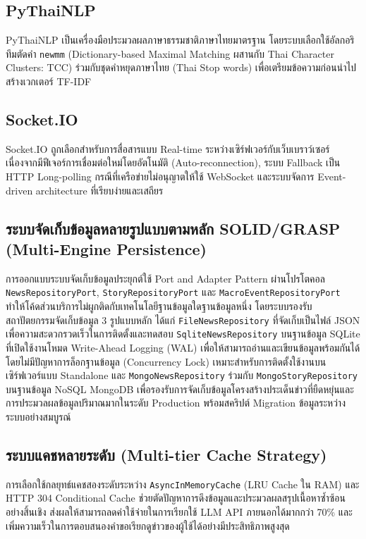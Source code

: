 \subsection{PyThaiNLP}
PyThaiNLP \cite{pythainlp2021} เป็นเครื่องมือประมวลผลภาษาธรรมชาติภาษาไทยมาตรฐาน โดยระบบเลือกใช้อัลกอริทึมตัดคำ \texttt{newmm} (Dictionary-based Maximal Matching ผสานกับ Thai Character Clusters: TCC) ร่วมกับชุดคำหยุดภาษาไทย (Thai Stop words) เพื่อเตรียมข้อความก่อนนำไปสร้างเวกเตอร์ TF-IDF

\subsection{Socket.IO}
Socket.IO \cite{socketio2024} ถูกเลือกสำหรับการสื่อสารแบบ Real-time ระหว่างเซิร์ฟเวอร์กับเว็บเบราว์เซอร์ เนื่องจากมีฟีเจอร์การเชื่อมต่อใหม่โดยอัตโนมัติ (Auto-reconnection), ระบบ Fallback เป็น HTTP Long-polling กรณีที่เครือข่ายไม่อนุญาตให้ใช้ WebSocket และระบบจัดการ Event-driven architecture ที่เรียบง่ายและเสถียร


\subsection{ระบบจัดเก็บข้อมูลหลายรูปแบบตามหลัก SOLID/GRASP (Multi-Engine Persistence)}
การออกแบบระบบจัดเก็บข้อมูลประยุกต์ใช้ Port and Adapter Pattern ผ่านโปรโตคอล \texttt{NewsRepositoryPort}, \texttt{StoryRepositoryPort} และ \texttt{MacroEventRepositoryPort} ทำให้โค้ดส่วนบริการไม่ผูกติดกับเทคโนโลยีฐานข้อมูลใดฐานข้อมูลหนึ่ง โดยระบบรองรับสถาปัตยกรรมจัดเก็บข้อมูล 3 รูปแบบหลัก ได้แก่ \texttt{FileNewsRepository} ที่จัดเก็บเป็นไฟล์ JSON เพื่อความสะดวกรวดเร็วในการติดตั้งและทดสอบ \texttt{SqliteNewsRepository} บนฐานข้อมูล SQLite ที่เปิดใช้งานโหมด Write-Ahead Logging (WAL) \cite{sqlite_wal} เพื่อให้สามารถอ่านและเขียนข้อมูลพร้อมกันได้โดยไม่มีปัญหาการล็อกฐานข้อมูล (Concurrency Lock) เหมาะสำหรับการติดตั้งใช้งานบนเซิร์ฟเวอร์แบบ Standalone และ \texttt{MongoNewsRepository} ร่วมกับ \texttt{MongoStoryRepository} บนฐานข้อมูล NoSQL MongoDB เพื่อรองรับการจัดเก็บข้อมูลโครงสร้างประเด็นข่าวที่ยืดหยุ่นและการประมวลผลข้อมูลปริมาณมากในระดับ Production พร้อมสคริปต์ Migration ข้อมูลระหว่างระบบอย่างสมบูรณ์


\subsection{ระบบแคชหลายระดับ (Multi-tier Cache Strategy)}
การเลือกใช้กลยุทธ์แคชสองระดับระหว่าง \texttt{AsyncInMemoryCache} (LRU Cache ใน RAM) และ HTTP 304 Conditional Cache ช่วยตัดปัญหาการดึงข้อมูลและประมวลผลสรุปเนื้อหาซ้ำซ้อนอย่างสิ้นเชิง ส่งผลให้สามารถลดค่าใช้จ่ายในการเรียกใช้ LLM API ภายนอกได้มากกว่า 70\% และเพิ่มความเร็วในการตอบสนองคำขอเรียกดูข่าวของผู้ใช้ได้อย่างมีประสิทธิภาพสูงสุด
